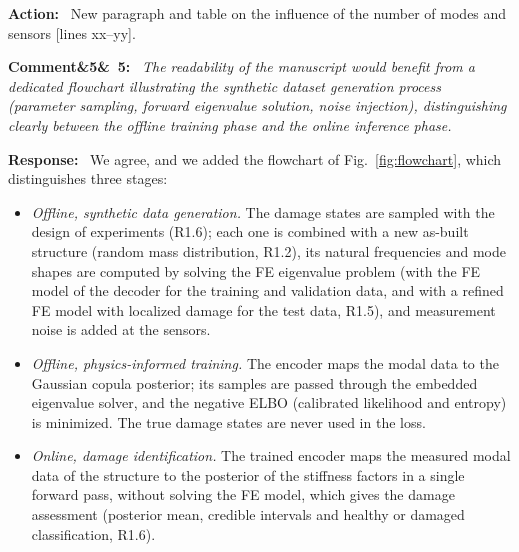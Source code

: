 \documentclass[11pt]{article}
\newenvironment{rcomment}[1]{\par\bigskip\noindent\textbf{Comment\ifx&#1&\else\ #1\fi:}\ \itshape}{\par}
\newenvironment{response}{\par\smallskip\noindent\color{resp}\textbf{Response:}\ }{\par}
\newenvironment{action}{\par\smallskip\noindent\color{resp}\textbf{Action:}\ }{\par}
\newcommand{\tbd}[1]{\textcolor{note}{\textsf{[#1]}}}
\newcommand{\lines}[1]{\tbd{lines #1}}
\begin{document}
\begin{action}
New paragraph and table on the influence of the number of modes and sensors \lines{xx--yy}.
\end{action}

\begin{rcomment}{5}
The readability of the manuscript would benefit from a dedicated flowchart illustrating the synthetic dataset
generation process (parameter sampling, forward eigenvalue solution, noise injection), distinguishing clearly between
the offline training phase and the online inference phase.
\end{rcomment}

\begin{response}
We agree, and we added the flowchart of Fig.~\ref{fig:flowchart}, which distinguishes three stages:
\begin{itemize}[leftmargin=*]
\item \emph{Offline, synthetic data generation.} The damage states are sampled with the design of experiments (R1.6);
each one is combined with a new as-built structure (random mass distribution, R1.2), its natural frequencies and mode
shapes are computed by solving the FE eigenvalue problem (with the FE model of the decoder for the training and
validation data, and with a refined FE model with localized damage for the test data, R1.5), and measurement noise is
added at the sensors.
\item \emph{Offline, physics-informed training.} The encoder maps the modal data to the Gaussian copula posterior; its
samples are passed through the embedded eigenvalue solver, and the negative ELBO (calibrated likelihood and entropy) is
minimized. The true damage states are never used in the loss.
\item \emph{Online, damage identification.} The trained encoder maps the measured modal data of the structure to the
posterior of the stiffness factors in a single forward pass, without solving the FE model, which gives the damage
assessment (posterior mean, credible intervals and healthy or damaged classification, R1.6).
\end{itemize}
\end{response}
\end{document}
